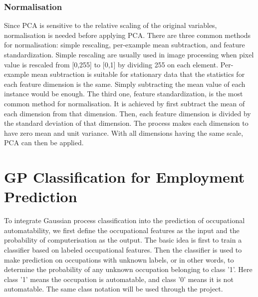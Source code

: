 \documentclass[11pt]{report}
\numberwithin{equation}{chapter}
\begin{document}
\begin{spacing}{2}
\subsection{Normalisation}
Since PCA is sensitive to the relative scaling of the original variables, normalisation\cite{kotsiantis2006data} is needed before applying PCA\cite{PCA_AN}. There are three common methods for normalisation: simple rescaling, per-example mean subtraction, and feature standardization. Simple rescaling are usually used in image processing when pixel value is rescaled from [0,255] to [0,1] by dividing 255 on each element. Per-example mean subtraction is suitable for stationary data that the statistics for each feature dimension is the same. Simply subtracting the mean value of each instance would be enough. The third one, feature standardization, is the most common method for normalisation. It is achieved by first subtract the mean of each dimension from that dimension. Then, each feature dimension is divided by the standard deviation of that dimension. The process makes each dimension to have zero mean and unit variance. With all dimensions having the same scale, PCA can then be applied.



\chapter{GP Classification for Employment Prediction}
\label{GP_for_employment}
To integrate Gaussian process classification into the prediction of occupational automatability, we first define the occupational features as the input and the probability of computerisation as the output. The basic idea is first to train a classifier based on labeled occupational features. Then the classifier is used to make prediction on occupations with unknown labels, or in other words, to determine the probability of any unknown occupation belonging to class '1'. Here class '1' means the occupation is automatable, and class '0' means it is not automatable. The same class notation will be used through the project.  
  


\end{spacing}
\end{document}
